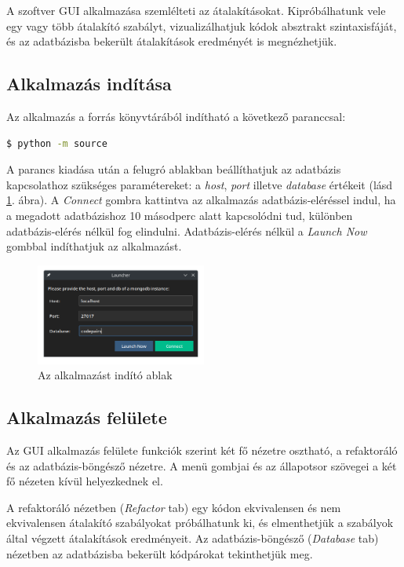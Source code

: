 A szoftver GUI alkalmazása szemlélteti az átalakításokat.
Kipróbálhatunk vele egy vagy több átalakító szabályt,
vizualizálhatjuk kódok absztrakt szintaxisfáját,
és az adatbázisba bekerült átalakítások eredményét is megnézhetjük.

\subsection{Alkalmazás indítása}

Az alkalmazás a forrás könyvtárából indítható a következő paranccsal:

\begin{lstlisting}[language=bash, numbers=none]
	$ python -m source
\end{lstlisting}

A parancs kiadása után a felugró ablakban beállíthatjuk az adatbázis kapcsolathoz szükséges paramétereket:
a \emph{host}, \emph{port} illetve \emph{database} értékeit (lásd \ref{fig:launcher}. ábra).
A \emph{Connect} gombra kattintva az alkalmazás adatbázis-eléréssel indul,
ha a megadott adatbázishoz 10 másodperc alatt kapcsolódni tud,
különben adatbázis-elérés nélkül fog elindulni.
Adatbázis-elérés nélkül a \emph{Launch Now} gombbal indíthatjuk az alkalmazást.

\begin{figure}[H]
	\centering
	\includegraphics[width=0.5\textwidth]{images/screenshots/launcher.png}
	\caption{\label{fig:launcher}Az alkalmazást indító ablak}
\end{figure}

\subsection{Alkalmazás felülete}

Az GUI alkalmazás felülete funkciók szerint két fő nézetre osztható, a refaktoráló és az adatbázis-böngésző nézetre.
A menü gombjai és az állapotsor szövegei a két fő nézeten kívül helyezkednek el.

A refaktoráló nézetben (\emph{Refactor} tab) egy kódon
ekvivalensen és nem ekvivalensen átalakító szabályokat próbálhatunk ki, és elmenthetjük
a szabályok által végzett átalakítások eredményeit.
Az adatbázis-böngésző (\emph{Database} tab) nézetben az adatbázisba bekerült kódpárokat tekinthetjük meg.

